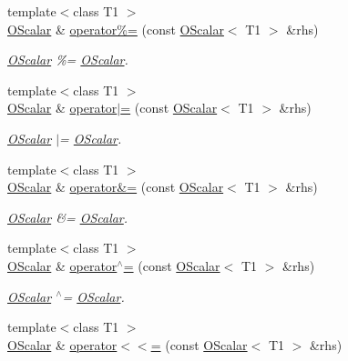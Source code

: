 \begin{DoxyCompactItemize}
{\footnotesize template$<$class T1 $>$ }\\\mbox{\hyperlink{classENSEM_1_1OScalar}{O\+Scalar}} \& \mbox{\hyperlink{classENSEM_1_1OScalar_a89a76b1229e185250c0b9c48ae13d98b}{operator\%=}} (const \mbox{\hyperlink{classENSEM_1_1OScalar}{O\+Scalar}}$<$ T1 $>$ \&rhs)
\begin{DoxyCompactList}\small\item\em \mbox{\hyperlink{classENSEM_1_1OScalar}{O\+Scalar}} \%= \mbox{\hyperlink{classENSEM_1_1OScalar}{O\+Scalar}}. \end{DoxyCompactList}\item 
{\footnotesize template$<$class T1 $>$ }\\\mbox{\hyperlink{classENSEM_1_1OScalar}{O\+Scalar}} \& \mbox{\hyperlink{classENSEM_1_1OScalar_aeffba612ea04593253d41332d6d2aa82}{operator$\vert$=}} (const \mbox{\hyperlink{classENSEM_1_1OScalar}{O\+Scalar}}$<$ T1 $>$ \&rhs)
\begin{DoxyCompactList}\small\item\em \mbox{\hyperlink{classENSEM_1_1OScalar}{O\+Scalar}} $\vert$= \mbox{\hyperlink{classENSEM_1_1OScalar}{O\+Scalar}}. \end{DoxyCompactList}\item 
{\footnotesize template$<$class T1 $>$ }\\\mbox{\hyperlink{classENSEM_1_1OScalar}{O\+Scalar}} \& \mbox{\hyperlink{classENSEM_1_1OScalar_a9a192875355f059d207c579e2514b2a3}{operator\&=}} (const \mbox{\hyperlink{classENSEM_1_1OScalar}{O\+Scalar}}$<$ T1 $>$ \&rhs)
\begin{DoxyCompactList}\small\item\em \mbox{\hyperlink{classENSEM_1_1OScalar}{O\+Scalar}} \&= \mbox{\hyperlink{classENSEM_1_1OScalar}{O\+Scalar}}. \end{DoxyCompactList}\item 
{\footnotesize template$<$class T1 $>$ }\\\mbox{\hyperlink{classENSEM_1_1OScalar}{O\+Scalar}} \& \mbox{\hyperlink{classENSEM_1_1OScalar_af66decef8e6be220193ad1292a927e2f}{operator$^\wedge$=}} (const \mbox{\hyperlink{classENSEM_1_1OScalar}{O\+Scalar}}$<$ T1 $>$ \&rhs)
\begin{DoxyCompactList}\small\item\em \mbox{\hyperlink{classENSEM_1_1OScalar}{O\+Scalar}} $^\wedge$= \mbox{\hyperlink{classENSEM_1_1OScalar}{O\+Scalar}}. \end{DoxyCompactList}\item 
{\footnotesize template$<$class T1 $>$ }\\\mbox{\hyperlink{classENSEM_1_1OScalar}{O\+Scalar}} \& \mbox{\hyperlink{classENSEM_1_1OScalar_a93607b92c63ae779d9d3ed131df3f449}{operator$<$$<$=}} (const \mbox{\hyperlink{classENSEM_1_1OScalar}{O\+Scalar}}$<$ T1 $>$ \&rhs)

\end{DoxyCompactItemize}
